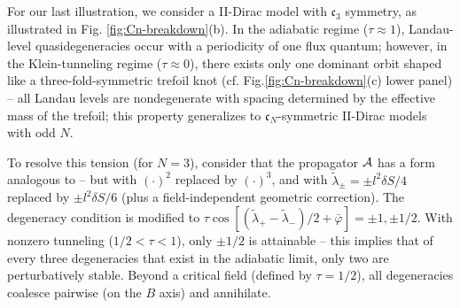 \documentclass[aps, prb, showpacs, twocolumn, notitlepage, superscriptaddress]{revtex4-1}
\begin{document}











For our last illustration, we consider a II-Dirac model with $\mathfrak{c}_3$  symmetry, as   illustrated in Fig. \ref{fig:Cn-breakdown}(b). In the adiabatic regime ($\tau{\approx}1$), Landau-level quasidegeneracies occur with a periodicity of one flux quantum; however, in the Klein-tunneling regime ($\tau{\approx}0$), there exists only one dominant orbit shaped like a three-fold-symmetric trefoil knot (cf. Fig.\ref{fig:Cn-breakdown}(c) lower panel) --  all Landau levels are nondegenerate with spacing determined by the effective mass of the trefoil; this property generalizes to $\mathfrak{c}_N$-symmetric II-Dirac models with odd $N$.   

To resolve this tension (for $N{=}3$), consider that the propagator ${\cal A}$ has a form analogous to  -- but with $(\cdot)^2$ replaced by $(\cdot)^3$, and with $\tilde{\lambda}_\pm{=}{\pm} l^2\delta S/4$ replaced by $\pm l^2\delta S/6$ (plus a field-independent geometric correction). The degeneracy condition is modified to $\tau\cos[(\tilde{\lambda}_+{-}\tilde{\lambda}_-)/2{+}\bar{\varphi}]{=}{\pm} 1,{\pm} 1/2$. With nonzero tunneling ($1/2{<}\tau {<}1$), only $\pm 1/2$ is attainable -- this implies that of every three degeneracies that exist in the adiabatic limit, only two are perturbatively stable. Beyond a critical field  (defined by $\tau{=}1/2$), all degeneracies coalesce pairwise (on the $B$ axis) and annihilate. 
\end{document}
